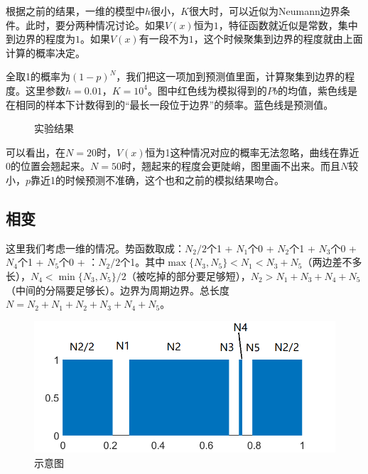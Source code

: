 \documentclass[12pt,a4paper]{article}
\begin{document}
根据之前的结果，一维的模型中$h$很小，$K$很大时，可以近似为Neumann边界条件。此时，要分两种情况讨论。如果$V(x)$恒为$1$，特征函数就近似是常数，集中到边界的程度为$1$。如果$V(x)$有一段不为$1$，这个时候聚集到边界的程度就由上面计算的概率决定。

全取1的概率为$(1-p)^N$，我们把这一项加到预测值里面，计算聚集到边界的程度。这里参数$h=0.01$，$K=10^4$。图中红色线为模拟得到的$Pb$的均值，紫色线是在相同的样本下计数得到的“最长一段位于边界”的频率。蓝色线是预测值。

\begin{figure}[h]
\centering
{}
\caption{实验结果}
\label{extra}
\end{figure}

可以看出，在$N=20$时，$V(x)$恒为1这种情况对应的概率无法忽略，曲线在靠近0的位置会翘起来。$N=50$时，翘起来的程度会更陡峭，图里画不出来。而且$N$较小，$p$靠近1的时候预测不准确，这个也和之前的模拟结果吻合。

\newpage
\subsection*{相变}
这里我们考虑一维的情况。势函数取成：$N_2/2$个1 + $N_1$个0 + $N_2$个1 +  $N_3$个0 +  $N_4$个1 +  $N_5$个0 + ：$N_2/2$个1。其中$\max\{N_3, N_5\} < N_1 < N_3 + N_5$（两边差不多长），$N_4 < \min\{N_3, N_5\} / 2$（被吃掉的部分要足够短），$N_2 > N_1+ N_3 + N_4 + N_5$（中间的分隔要足够长）。边界为周期边界。总长度$N = N_2 + N_1 + N_2 + N_3 + N_4 + N_5$。
\begin{figure}[h]
\centering
\includegraphics[width=0.7\linewidth]{N}
\caption{示意图}
\end{figure}
\end{document}
